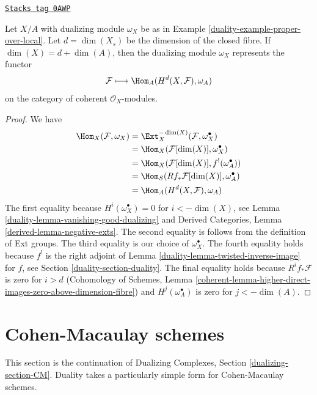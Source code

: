 \begin{lemma}
\label{duality-lemma-dualizing-module-proper-over-A}
\href{https://stacks.math.columbia.edu/tag/0AWP}{\texttt{Stacks tag 0AWP}}

Let $X/A$ with dualizing module $\omega_X$ be as in
Example \ref{duality-example-proper-over-local}.
Let $d = \dim(X_s)$ be the dimension
of the closed fibre. If $\dim(X) = d + \dim(A)$, then
the dualizing module $\omega_X$ represents the functor
$$
\mathcal{F} \longmapsto \Hom_A(H^d(X, \mathcal{F}), \omega_A)
$$
on the category of coherent $\mathcal{O}_X$-modules.
\end{lemma}

\begin{proof}

We have
\begin{align*}
\Hom_X(\mathcal{F}, \omega_X)
& =
\Ext^{-\dim(X)}_X(\mathcal{F}, \omega_X^\bullet) \\
& =
\Hom_X(\mathcal{F}[\dim(X)], \omega_X^\bullet) \\
& =
\Hom_X(\mathcal{F}[\dim(X)], f^!(\omega_A^\bullet)) \\
& =
\Hom_S(Rf_*\mathcal{F}[\dim(X)], \omega_A^\bullet) \\
& =
\Hom_A(H^d(X, \mathcal{F}), \omega_A)
\end{align*}
The first equality because $H^i(\omega_X^\bullet) = 0$ for
$i < -\dim(X)$, see Lemma \ref{duality-lemma-vanishing-good-dualizing} and
Derived Categories, Lemma \ref{derived-lemma-negative-exts}.
The second equality is follows from the definition of Ext groups.
The third equality is our choice of $\omega_X^\bullet$.
The fourth equality holds because $f^!$ is the
right adjoint of Lemma \ref{duality-lemma-twisted-inverse-image} for
$f$, see Section \ref{duality-section-duality}.
The final equality holds because $R^if_*\mathcal{F}$ is zero
for $i > d$ (Cohomology of Schemes, Lemma
\ref{coherent-lemma-higher-direct-images-zero-above-dimension-fibre})
and $H^j(\omega_A^\bullet)$ is zero for $j < -\dim(A)$.
\end{proof}

\section{Cohen-Macaulay schemes}
\label{duality-section-CM}
This section is the continuation of Dualizing Complexes, Section
\ref{dualizing-section-CM}.
Duality takes a particularly simple form for Cohen-Macaulay schemes.

